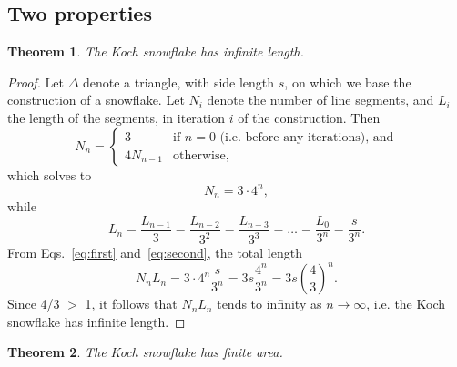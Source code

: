 \documentclass[12pt, a4paper]{article}
\newcommand{\uberfrac}[1]{
	= \frac {L_{n - #1}} {3^#1}
}
\newtheorem{theorem}{Theorem}
\begin{document}
\subsection{Two properties}
\begin{theorem}
	The Koch snowflake has infinite length.
\end{theorem}
\begin{proof}
Let $\Delta$ denote a triangle, with side length $s$, on which
we base the construction of a snowflake. Let $N_i$ denote the number of line
segments, and $L_i$ the length of the segments, in iteration $i$ of the
construction. Then%
$$%
	N_n =
	\begin{cases}
		3 &\text{if } n = 0 \text{ (i.e. before any iterations), and} \\
		4N_{n-1} &\text{otherwise,}
	\end{cases}
$$%
which solves to
\begin{equation} \label{eq:first}
	N_n = 3 \cdot 4^n,
\end{equation}
while
\begin{equation}\label{eq:second}
	L_n = \frac {L_{n-1}} {3} \uberfrac{2} \uberfrac{3} = \ldots =
		\frac{L_0} {3^n} = \frac s {3^n}.
\end{equation}
From Eqs.~\ref{eq:first} and~\ref{eq:second}, the total length
$$
	N_nL_n = 3 \cdot 4^n \frac s {3^n} = 3s \frac {4^n} {3^n} = 3s \left (
		\frac 4 3
	\right )^n.
$$
Since 4/3 $>$ 1, it follows that $N_nL_n$ tends to infinity as
$n \to \infty$, i.e. the Koch snowflake has infinite length.
\end{proof}
\begin{theorem}
	The Koch snowflake has finite area.
\end{theorem}
\end{document}
